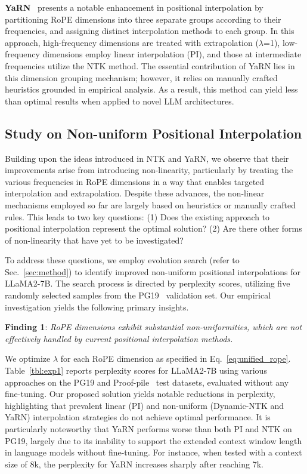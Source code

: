\textbf{YaRN}~\cite{yarn} presents a notable enhancement in positional interpolation by partitioning RoPE dimensions into three separate groups according to their frequencies, and assigning distinct interpolation methods to each group. In this approach, high-frequency dimensions are treated with extrapolation ($\lambda$=1), low-frequency dimensions employ linear interpolation (PI), and those at intermediate frequencies utilize the NTK method. The essential contribution of YaRN lies in this dimension grouping mechanism; however, it relies on manually crafted heuristics grounded in empirical analysis. As a result, this method can yield less than optimal results when applied to novel LLM architectures.

\subsection{Study on Non-uniform Positional Interpolation}

Building upon the ideas introduced in NTK and YaRN, we observe that their improvements arise from introducing non-linearity, particularly by treating the various frequencies in RoPE dimensions in a way that enables targeted interpolation and extrapolation. Despite these advances, the non-linear mechanisms employed so far are largely based on heuristics or manually crafted rules. This leads to two key questions: (1) Does the existing approach to positional interpolation represent the optimal solution? (2) Are there other forms of non-linearity that have yet to be investigated?

To address these questions, we employ evolution search (refer to Sec.~\ref{sec:method}) to identify improved non-uniform positional interpolations for LLaMA2-7B. The search process is directed by perplexity scores, utilizing five randomly selected samples from the PG19~\cite{pg19} validation set. Our empirical investigation yields the following primary insights.

\textbf{Finding 1}: \textit{RoPE dimensions exhibit substantial non-uniformities, which are not effectively handled by current positional interpolation methods.}

We optimize $\lambda$ for each RoPE dimension as specified in Eq.~\ref{eq:unified_rope}. Table~\ref{tbl:exp1} reports perplexity scores for LLaMA2-7B using various approaches on the PG19 and Proof-pile~\cite{proof-pile} test datasets, evaluated without any fine-tuning. Our proposed solution yields notable reductions in perplexity, highlighting that prevalent linear (PI) and non-uniform (Dynamic-NTK and YaRN) interpolation strategies do not achieve optimal performance. It is particularly noteworthy that YaRN performs worse than both PI and NTK on PG19, largely due to its inability to support the extended context window length in language models without fine-tuning. For instance, when tested with a context size of 8k, the perplexity for YaRN increases sharply after reaching 7k.

